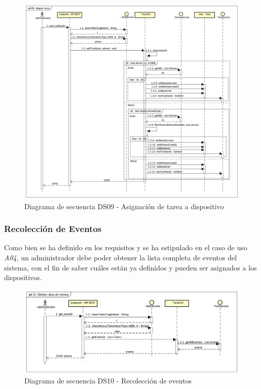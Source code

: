 \begin{figure}[H]
    \centering
    \includegraphics[width=14cm]{./img/sequence/diagram/AssignTask.png}
    \caption{Diagrama de secuencia DS09 - Asignación de tarea a dispositivo}
    \label{fig:seq.AssignTask}
\end{figure}

\newpage
\subsubsection{Recolección de Eventos}
Como bien se ha definido en los requisitos y se ha estipulado en el caso de uso \textit{A04}, un administrador debe poder obtener la lista completa de eventos del sistema, con el fin de saber cuáles están ya definidos y pueden ser asignados a los dispositivos.

\begin{figure}[H]
    \centering
    \includegraphics[width=14cm]{./img/sequence/diagram/GetEvents.png}
    \caption{Diagrama de secuencia DS10 - Recolección de eventos}
    \label{fig:seq.GetEvents}
\end{figure}

